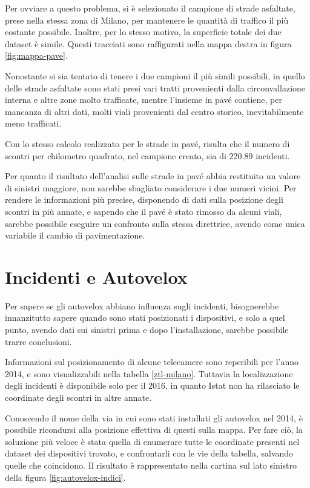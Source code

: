 \documentclass[a4paper,12pt]{report}
\begin{document}
Per ovviare a questo problema, si è selezionato il campione di strade asfaltate, 
prese nella stessa zona di Milano, per mantenere le quantità di traffico il più 
costante possibile. 
Inoltre, per lo stesso motivo, la superficie totale dei due dataset è simile. 
Questi tracciati sono raffigurati nella mappa destra in figura \ref{fig:mappa-pave}. 

Nonostante si sia tentato di tenere i due campioni il più simili 
possibili, in quello delle strade asfaltate sono stati presi vari tratti 
provenienti dalla circonvallazione interna e altre zone molto trafficate, 
mentre l'insieme in pavé contiene, per mancanza di altri dati, 
molti viali provenienti dal centro storico, inevitabilmente 
meno trafficati. 

Con lo stesso calcolo realizzato per le strade in pavé, risulta che 
il numero di scontri per 
chilometro quadrato, nel campione creato, sia di $220.89$ incidenti. 

Per quanto il risultato dell'analisi sulle strade in pavé abbia restituito un valore di 
sinistri maggiore, non sarebbe sbagliato considerare i due numeri vicini. 
Per rendere le informazioni più precise, disponendo di dati sulla 
posizione degli scontri in più annate, e sapendo che il pavé è stato 
rimosso da alcuni viali, sarebbe possibile eseguire un confronto 
sulla stessa direttrice, avendo come unica variabile il cambio di pavimentazione. 

\section{Incidenti e Autovelox}

Per sapere se gli autovelox abbiano influenza sugli incidenti, 
bisognerebbe innanzitutto sapere quando sono stati posizionati i dispositivi, e solo 
a quel punto, avendo dati sui sinistri prima e dopo l'installazione, sarebbe 
possibile trarre conclusioni. 

Informazioni sul posizionamento di alcune telecamere sono reperibili per 
l'anno 2014, e sono visualizzabili nella tabella \ref{ztl-milano}. 
Tuttavia la localizzazione degli incidenti 
è disponibile solo per il 2016, in quanto Istat non ha rilasciato 
le coordinate degli scontri in altre annate. 

Conoscendo il nome della via in cui sono stati installati gli autovelox nel 2014, 
è possibile ricondursi alla posizione effettiva di questi sulla mappa. 
Per fare ciò, la soluzione più veloce è stata quella di enumerare tutte le coordinate presenti 
nel dataset dei dispositivi trovato, 
e confrontarli con le vie della tabella, salvando quelle che coincidono. 
Il risultato è rappresentato nella cartina sul lato sinistro della 
figura \ref{fig:autovelox-indici}. 
\end{document}
